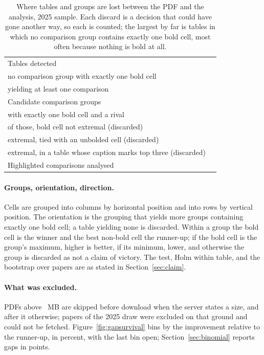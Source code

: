 \documentclass{article}
\begin{document}
\begin{table}[h]
\centering
\caption{Where tables and groups are lost between the PDF and the analysis,
2025 sample. Each discard is a decision that could have gone another way, so
each is counted; the largest by far is tables in which no comparison group
contains exactly one bold cell, most often because nothing is bold at all.}
\label{tab:funnel}
\small
\begin{tabular}{lr}
\toprule
Tables detected & \nTablesDetected{} \\
\quad no comparison group with exactly one bold cell & \nTablesNoOrientation{} \\
\quad yielding at least one comparison & \nTablesYielding{} \\
\midrule
Candidate comparison groups & \nCandidateGroups{} \\
\quad with exactly one bold cell and a rival & \nPctGroupsUsable{} \\
\quad of those, bold cell not extremal (discarded) & \nPctBoldNotExtremal{} \\
\quad extremal, tied with an unbolded cell (discarded) & \nGroupsTied{} \\
\quad extremal, in a table whose caption marks top three (discarded) & \nGroupsTopk{} \\
\midrule
Highlighted comparisons analysed & \nComparisonsTwentyFive{} \\
\bottomrule
\end{tabular}
\end{table}

\paragraph{Groups, orientation, direction.} Cells are grouped into columns by
horizontal position and into rows by vertical position. The orientation is the
grouping that yields more groups containing exactly one bold cell; a table
yielding none is discarded. Within a group the bold cell is the winner and the
best non-bold cell the runner-up; if the bold cell is the group's maximum,
higher is better, if its minimum, lower, and otherwise the group is discarded as
not a claim of victory. The test, Holm within table, and the bootstrap over
papers are as stated in Section~\ref{sec:claim}.

\paragraph{What was excluded.} PDFs above \nMaxPdfMb{}~MB are skipped before
download when the server states a size, and after it otherwise;
\nSkippedLarge{} papers of the 2025 draw were excluded on that ground and
\nDownloadFailed{} could not be fetched. Figure~\ref{fig:gapsurvival} bins by
the improvement relative to the runner-up, in percent, with the last bin open;
Section~\ref{sec:binomial} reports gaps in points.
\end{document}
